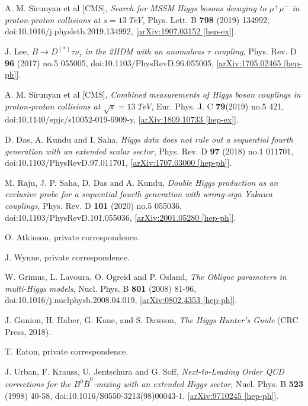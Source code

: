 \documentclass[a4paper,12pt]{article}
\begin{document}
\begin{thebibliography}{99}
A. M. Sirunyan et al [CMS], \emph{Search for MSSM Higgs bosons decaying to $\mu^+\mu^-$ in proton-proton collisions at $s=13\,$TeV}, Phys. Lett. B \textbf{798} (2019) 134992, doi:10.1016/j.physletb.2019.134992, [\href{https://arxiv.org/abs/1907.03152}{arXiv:1907.03152 [hep-ex]}].

J. Lee, \emph{$B\to D^{(*)}\tau\nu_\tau$ in the 2HDM with an anomalous $\tau$ coupling}, Phys. Rev. D \textbf{96} (2017) no.5 055005, doi:10.1103/PhysRevD.96.055005, [\href{https://arxiv.org/abs/1705.02465}{arXiv:1705.02465 [hep-ph]}].

A. M. Sirunyan et al [CMS], \emph{Combined measurements of Higgs boson couplings in proton-proton collisions at $\sqrt{s}=13\,$TeV}, Eur. Phys. J. C \textbf{79}(2019) no.5 421, doi:10.1140/epjc/s10052-019-6909-y, [\href{https://arxiv.org/abs/1809.10733}{arXiv:1809.10733 [hep-ex]}].

D. Das, A. Kundu and I. Saha, \emph{Higgs data does not rule out a sequential fourth generation with an extended scalar sector}, Phys. Rev. D \textbf{97} (2018) no.1 011701, doi:10.1103/PhysRevD.97.011701, [\href{https://arxiv.org/abs/1707.03000}{arXiv:1707.03000 [hep-ph]}].

M. Raju, J. P. Saha, D. Das and A. Kundu, \emph{Double Higgs production as an exclusive probe for a sequential fourth generation with wrong-sign Yukawa couplings}, Phys. Rev. D \textbf{101} (2020) no.5 055036, doi:10.1103/PhysRevD.101.055036, [\href{https://arxiv.org/abs/2001.05280}{arXiv:2001.05280 [hep-ph]}].

O. Atkinson, private correspondence.

J. Wynne, private correspondence.

W. Grimus, L. Lavoura, O. Ogreid and P. Osland, \emph{The Oblique parameters in multi-Higgs models}, Nucl. Phys. B \textbf{801} (2008) 81-96, doi:10.1016/j.nuclphysb.2008.04.019, [\href{https://arxiv.org/abs/0802.4353}{arXiv:0802.4353 [hep-ph]}].

J. Gunion, H. Haber, G. Kane, and S. Dawson, \emph{The Higgs Hunter's Guide} (CRC Press, 2018).

T. Eaton, private correspondence.

J. Urban, F. Krauss, U. Jentschura and G. Soff, \emph{Next-to-Leading Order QCD corrections for the $B^0\bar{B}^0$-mixing with an extended Higgs sector}, Nucl. Phys. B \textbf{523} (1998) 40-58, doi:10.1016/S0550-3213(98)00043-1, [\href{https://arxiv.org/abs/hep-ph/9710245}{arXiv:9710245 [hep-ph]}].

\end{thebibliography}
\end{document}
